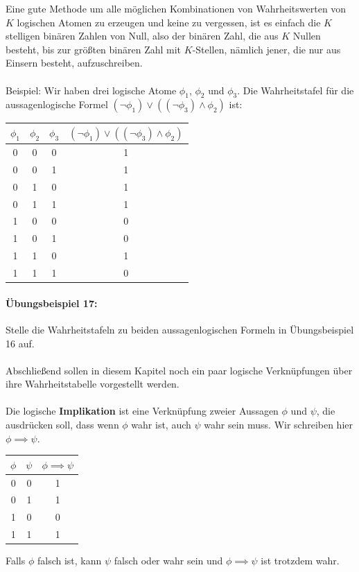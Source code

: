 \documentclass[11pt,a4paper,leqno]{report}
\numberwithin{equation}{chapter}
\begin{document}
Eine gute Methode um alle m\"oglichen Kombinationen von Wahrheitswerten von $K$ logischen Atomen zu erzeugen und keine zu vergessen, ist es einfach die $K$ stelligen bin\"aren Zahlen von Null, also der bin\"aren Zahl, die aus $K$ Nullen besteht, bis zur gr\"o\ss{}ten bin\"aren Zahl mit $K$-Stellen, n\"amlich jener, die nur aus Einsern besteht, aufzuschreiben.\\
\\
Beispiel: Wir haben drei logische Atome $\phi_1$, $\phi_2$ und $\phi_3$. Die Wahrheitstafel f\"ur die aussagenlogische Formel $(\neg\phi_1)\vee((\neg\phi_3)\wedge\phi_2)$ ist:
\begin{center}
	\begin{tabular}{|c c c|c|}
	$\phi_1$ & $\phi_2$ & $\phi_3$ & $(\neg\phi_1)\vee((\neg\phi_3)\wedge\phi_2)$\\
	\hline
	0 & 0 & 0 & 1\\
	0 & 0 & 1 & 1\\
	0 & 1 & 0 & 1\\
	0 & 1 & 1 & 1\\
	1 & 0 & 0 & 0\\
	1 & 0 & 1 & 0\\
	1 & 1 & 0 & 1\\
	1 & 1 & 1 & 0\\
\end{tabular}  
\end{center}
\paragraph{\"Ubungsbeispiel 17:} Stelle die Wahrheitstafeln zu beiden aussagenlogischen Formeln in \"Ubungsbeispiel 16 auf.\\
\\
Abschlie\ss{}end sollen in diesem Kapitel noch ein paar logische Verkn\"upfungen \"uber ihre Wahrheitstabelle vorgestellt werden.\\
\\
Die logische \textbf{Implikation} ist eine Verkn\"upfung zweier Aussagen $\phi$ und $\psi$, die ausdr\"ucken soll, dass wenn $\phi$ wahr ist, auch $\psi$ wahr sein muss. Wir schreiben hier $\phi \implies \psi$.\\
\begin{center}
\begin{tabular}{|c c|c|}
	$\phi$ & $\psi$ & $\phi \implies \psi$\\
	\hline
	0 & 0 & 1\\
	0 & 1 & 1\\
	1 & 0 & 0\\
	1 & 1 & 1\\
\end{tabular}  
\end{center}
Falls $\phi$ falsch ist, kann $\psi$ falsch oder wahr sein und $\phi\implies\psi$ ist trotzdem wahr.
\end{document}
